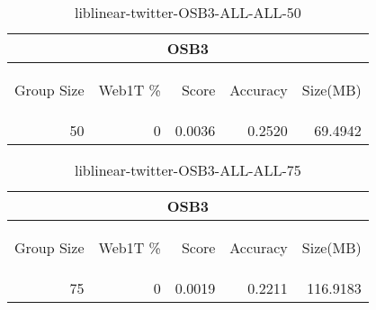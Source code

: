 \begin{center}
\begin{table}[htbp]
\begin{tabular}{ | r | r | r | r | r |}
\hline
\multicolumn{5}{|c|}{OSB3}\\
\hline
\begin{sideways}Group Size\end{sideways} & \begin{sideways}Web1T \%\end{sideways} & \begin{sideways}Score\end{sideways} & \begin{sideways}Accuracy\end{sideways} & \begin{sideways}Size(MB)\end{sideways}\\
\hline
\multirow{0}{*}{50}
 & 0 & 0.0036 & 0.2520 & 69.4942\\ \cline{2-5}
\hline
\end{tabular}
\caption{liblinear-twitter-OSB3-ALL-ALL-50}
\label{table:liblinear-twitter-OSB3-ALL-ALL-50}
\end{table}
\end{center}

\begin{center}
\begin{table}[htbp]
\begin{tabular}{ | r | r | r | r | r |}
\hline
\multicolumn{5}{|c|}{OSB3}\\
\hline
\begin{sideways}Group Size\end{sideways} & \begin{sideways}Web1T \%\end{sideways} & \begin{sideways}Score\end{sideways} & \begin{sideways}Accuracy\end{sideways} & \begin{sideways}Size(MB)\end{sideways}\\
\hline
\multirow{0}{*}{75}
 & 0 & 0.0019 & 0.2211 & 116.9183\\ \cline{2-5}
\hline
\end{tabular}
\caption{liblinear-twitter-OSB3-ALL-ALL-75}
\label{table:liblinear-twitter-OSB3-ALL-ALL-75}
\end{table}
\end{center}


